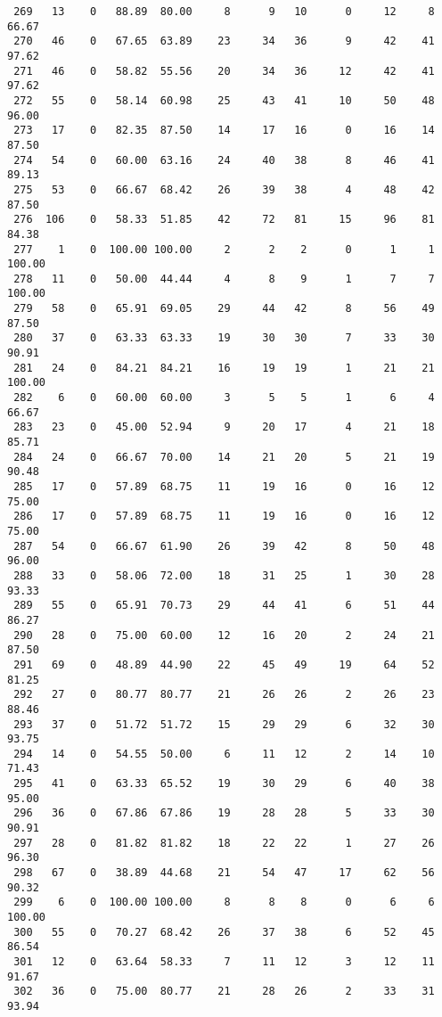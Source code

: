 \begin{verbatim}
 269   13    0   88.89  80.00     8      9   10      0     12     8    66.67
 270   46    0   67.65  63.89    23     34   36      9     42    41    97.62
 271   46    0   58.82  55.56    20     34   36     12     42    41    97.62
 272   55    0   58.14  60.98    25     43   41     10     50    48    96.00
 273   17    0   82.35  87.50    14     17   16      0     16    14    87.50
 274   54    0   60.00  63.16    24     40   38      8     46    41    89.13
 275   53    0   66.67  68.42    26     39   38      4     48    42    87.50
 276  106    0   58.33  51.85    42     72   81     15     96    81    84.38
 277    1    0  100.00 100.00     2      2    2      0      1     1   100.00
 278   11    0   50.00  44.44     4      8    9      1      7     7   100.00
 279   58    0   65.91  69.05    29     44   42      8     56    49    87.50
 280   37    0   63.33  63.33    19     30   30      7     33    30    90.91
 281   24    0   84.21  84.21    16     19   19      1     21    21   100.00
 282    6    0   60.00  60.00     3      5    5      1      6     4    66.67
 283   23    0   45.00  52.94     9     20   17      4     21    18    85.71
 284   24    0   66.67  70.00    14     21   20      5     21    19    90.48
 285   17    0   57.89  68.75    11     19   16      0     16    12    75.00
 286   17    0   57.89  68.75    11     19   16      0     16    12    75.00
 287   54    0   66.67  61.90    26     39   42      8     50    48    96.00
 288   33    0   58.06  72.00    18     31   25      1     30    28    93.33
 289   55    0   65.91  70.73    29     44   41      6     51    44    86.27
 290   28    0   75.00  60.00    12     16   20      2     24    21    87.50
 291   69    0   48.89  44.90    22     45   49     19     64    52    81.25
 292   27    0   80.77  80.77    21     26   26      2     26    23    88.46
 293   37    0   51.72  51.72    15     29   29      6     32    30    93.75
 294   14    0   54.55  50.00     6     11   12      2     14    10    71.43
 295   41    0   63.33  65.52    19     30   29      6     40    38    95.00
 296   36    0   67.86  67.86    19     28   28      5     33    30    90.91
 297   28    0   81.82  81.82    18     22   22      1     27    26    96.30
 298   67    0   38.89  44.68    21     54   47     17     62    56    90.32
 299    6    0  100.00 100.00     8      8    8      0      6     6   100.00
 300   55    0   70.27  68.42    26     37   38      6     52    45    86.54
 301   12    0   63.64  58.33     7     11   12      3     12    11    91.67
 302   36    0   75.00  80.77    21     28   26      2     33    31    93.94

\end{verbatim}
